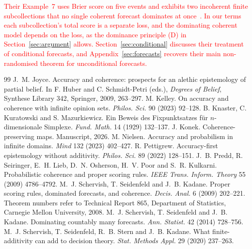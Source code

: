 \documentclass[11pt]{article}
\theoremstyle{definition}
\theoremstyle{remark}
\begin{document}
\textcolor{red}{Their Example~7 uses Brier score on five events and exhibits two incoherent finite subcollections that no single coherent forecast dominates at once~\cite[Example~7]{SSK09}. In our terms each subcollection's total score is a separate loss, and the dominating coherent model depends on the loss, as the dominance principle (D) in Section~\ref{sec:argument} allows. Section~\ref{sec:conditional} discusses their treatment of conditional forecasts, and Appendix~\ref{sec:forecasts} recovers their main non-randomised theorem for unconditional forecasts.}
\begin{thebibliography}{99}
 J.~M. Joyce. Accuracy and coherence: prospects for an alethic epistemology of partial belief. In F. Huber and C. Schmidt-Petri (eds.), \emph{Degrees of Belief}, Synthese Library 342, Springer, 2009, 263--297.
 M. Kelley. On accuracy and coherence with infinite opinion sets. \emph{Philos. Sci.} 90 (2023) 92--128.
 B. Knaster, C. Kuratowski and S. Mazurkiewicz. Ein Beweis des Fixpunktsatzes f\"ur $n$-dimensionale Simplexe. \emph{Fund. Math.} 14 (1929) 132--137.
 J. Konek. Coherence-preserving maps. Manuscript, 2026.
 M. Nielsen. Accuracy and probabilism in infinite domains. \emph{Mind} 132 (2023) 402--427.
 R. Pettigrew. Accuracy-first epistemology without additivity. \emph{Philos. Sci.} 89 (2022) 128--151.
 J.~B. Predd, R. Seiringer, E.~H. Lieb, D.~N. Osherson, H.~V. Poor and S.~R. Kulkarni. Probabilistic coherence and proper scoring rules. \emph{IEEE Trans. Inform. Theory} 55 (2009) 4786--4792.
 M.~J. Schervish, T. Seidenfeld and J.~B. Kadane. Proper scoring rules, dominated forecasts, and coherence. \emph{Decis. Anal.} 6 (2009) 202--221. Theorem numbers refer to Technical Report 865, Department of Statistics, Carnegie Mellon University, 2008.
 M.~J. Schervish, T. Seidenfeld and J.~B. Kadane. Dominating countably many forecasts. \emph{Ann. Statist.} 42 (2014) 728--756.
 M.~J. Schervish, T. Seidenfeld, R.~B. Stern and J.~B. Kadane. What finite-additivity can add to decision theory. \emph{Stat. Methods Appl.} 29 (2020) 237--263.
\end{thebibliography}
\end{document}
